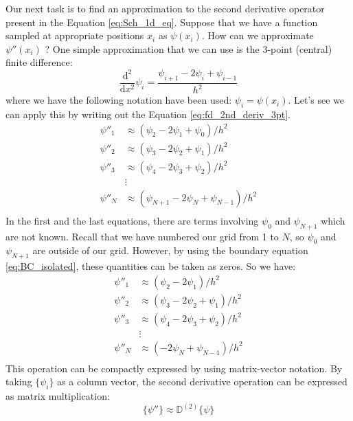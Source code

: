 Our next task is to find an approximation to the second derivative operator
present in the Equation \eqref{eq:Sch_1d_eq}. Suppose that we have a function
sampled at appropriate positions $x_i$ as $\psi(x_{i})$. How can we approximate
$\psi''(x_{i})$ ?
One simple approximation that we can use is the 3-point (central) finite difference:
\begin{equation}
\frac{\mathrm{d}^2}{\mathrm{d}x^2} \psi_{i} =
\frac{\psi_{i+1} - 2\psi_{i} + \psi_{i-1}}{h^2}
\label{eq:fd_2nd_deriv_3pt}
\end{equation}
where we have the following notation have been used: $\psi_{i} = \psi(x_{i})$.
Let's see we can apply this by writing out the Equation \eqref{eq:fd_2nd_deriv_3pt}.
\begin{align*}
\psi''_{1} & \approx \left( \psi_{2} - 2\psi_{1} + \psi_{0} \right)/h^2 \\
\psi''_{2} & \approx \left( \psi_{3} - 2\psi_{2} + \psi_{1} \right)/h^2 \\
\psi''_{3} & \approx \left( \psi_{4} - 2\psi_{3} + \psi_{2} \right)/h^2 \\
& \vdots \\
\psi''_{N} & \approx \left( \psi_{N+1} - 2\psi_{N} + \psi_{N-1} \right)/h^2 \\
\end{align*}
In the first and the last equations, there are terms involving $\psi_{0}$ and
$\psi_{N+1}$ which are not known. Recall that we have numbered
our grid from 1 to $N$, so $\psi_{0}$ and $\psi_{N+1}$ are outside of our
grid. However, by using the boundary equation \eqref{eq:BC_isolated}, these
quantities can be taken as zeros. So we have:
\begin{align*}
\psi''_{1} & \approx \left( \psi_{2} - 2\psi_{1} \right)/h^2 \\
\psi''_{2} & \approx \left( \psi_{3} - 2\psi_{2} + \psi_{1} \right)/h^2 \\
\psi''_{3} & \approx \left( \psi_{4} - 2\psi_{3} + \psi_{2} \right)/h^2 \\
& \vdots \\
\psi''_{N} & \approx \left( - 2\psi_{N} + \psi_{N-1} \right)/h^2 \\
\end{align*}
This operation can be compactly expressed by using matrix-vector notation.
By taking $\{ \psi_{i} \}$ as a column vector, the second derivative operation
can be expressed as matrix multiplication:
\begin{equation}
\{ \psi'' \} \approx \mathbb{D}^{(2)} \{ \psi \}
\end{equation}
